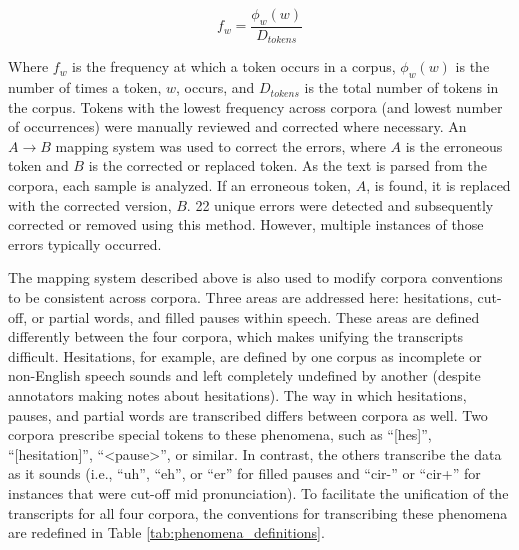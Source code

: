 \documentclass[12pt]{article}
\begin{document}
\begin{equation}\label{eq:token_frequency_occurrence}
    f_w = \frac{\phi_w(w)}{D_{tokens}}
\end{equation}

\noindent
Where $f_w$ is the frequency at which a token occurs in a corpus, $\phi_w(w)$ is the number of times a token, $w$, occurs, and $D_{tokens}$ is the
total number of tokens in the corpus. Tokens with the lowest frequency across corpora (and lowest number of occurrences) were manually reviewed and
corrected where necessary. An $A \rightarrow B$ mapping system was used to correct the errors, where \(A\) is the erroneous token and \(B\) is the
corrected or replaced token. As the text is parsed from the corpora, each sample is analyzed. If an erroneous token, $A$, is found, it is replaced
with the corrected version, $B$. 22 unique errors were detected and subsequently corrected or removed using this method. However, multiple instances
of those errors typically occurred.

The mapping system described above is also used to modify corpora conventions to be consistent across corpora. Three areas are addressed here:
hesitations, cut-off, or partial words, and filled pauses within speech. These areas are defined differently between the four corpora, which makes
unifying the transcripts difficult. Hesitations, for example, are defined by one corpus as incomplete or non-English speech sounds and left completely
undefined by another (despite annotators making notes about hesitations). The way in which hesitations, pauses, and partial words are transcribed
differs between corpora as well. Two corpora prescribe special tokens to these phenomena, such as ``[hes]'', ``[hesitation]'', ``<pause>'', or
similar. In contrast, the others transcribe the data as it sounds (i.e., ``uh'', ``eh'', or ``er'' for filled pauses and ``cir-'' or ``cir+'' for
instances that were cut-off mid pronunciation). To facilitate the unification of the transcripts for all four corpora, the conventions for
transcribing these phenomena are redefined in Table \ref{tab:phenomena_definitions}.
\end{document}
